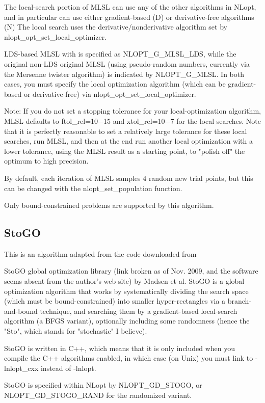 The local-search portion of MLSL can use any of the other algorithms in NLopt, and in particular can use either gradient-based (D) or derivative-free algorithms (N) The local search uses the derivative/nonderivative algorithm set by nlopt\_opt\_set\_local\_optimizer. 

LDS-based MLSL with is specified as NLOPT\_G\_MLSL\_LDS, while the original non-LDS original MLSL (using pseudo-random numbers, currently via the Mersenne twister algorithm) is indicated by NLOPT\_G\_MLSL. In both cases, you must specify the local optimization algorithm (which can be gradient-based or derivative-free) via nlopt\_opt\_set\_local\_optimizer. 

Note: If you do not set a stopping tolerance for your local-optimization algorithm, MLSL defaults to ftol\_rel=10−15 and xtol\_rel=10−7 for the local searches. Note that it is perfectly reasonable to set a relatively large tolerance for these local searches, run MLSL, and then at the end run another local optimization with a lower tolerance, using the MLSL result as a starting point, to "polish off" the optimum to high precision. 

By default, each iteration of MLSL samples 4 random new trial points, but this can be changed with the nlopt\_set\_population function. 

Only bound-constrained problems are supported by this algorithm. 




\subsection{StoGO}
This is an algorithm adapted from the code downloaded from 

StoGO global optimization library (link broken as of Nov. 2009, and the software seems absent from the author's web site) 
by Madsen et al. StoGO is a global optimization algorithm that works by systematically dividing the search space (which must be bound-constrained) into smaller hyper-rectangles via a branch-and-bound technique, and searching them by a gradient-based local-search algorithm (a BFGS variant), optionally including some randomness (hence the "Sto", which stands for "stochastic" I believe). 

StoGO is written in C++, which means that it is only included when you compile the C++ algorithms enabled, in which case (on Unix) you must link to -lnlopt\_cxx instead of -lnlopt. 

StoGO is specified within NLopt by NLOPT\_GD\_STOGO, or NLOPT\_GD\_STOGO\_RAND for the randomized variant. 

